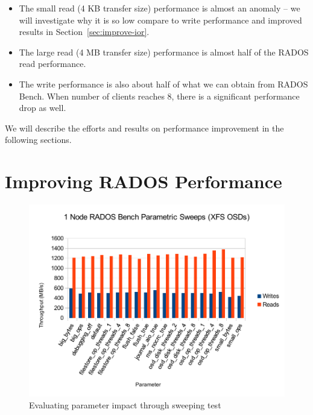 \documentclass{article}
\begin{document}
\begin{itemize}
  \item The small read (4 KB transfer size) performance is almost an anomaly --
  we will investigate why it is so low compare to write performance and improved
  results in Section~\ref{sec:improve-ior}.
  \item The large read (4 MB transfer size) performance is almost half of the
  RADOS read performance.
   
  \item The write performance is also about half of what we can obtain from
  RADOS Bench. When number of clients reaches 8, there is a significant
  performance drop as well. 
\end{itemize}



We will describe the efforts and results on performance improvement in the
following sections.

\section{Improving RADOS Performance}

\begin{figure}[h]
\centering
\includegraphics[width=5in]{parametric}
\caption{Evaluating parameter impact through sweeping test}
\label{fig:parametric}
\end{figure}
\end{document}
